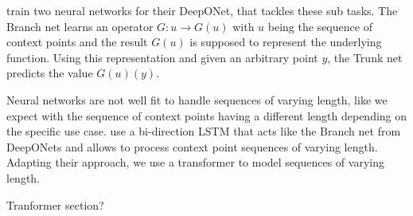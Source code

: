 \citet{Lu_2021} train two neural networks for their DeepONet, that tackles these sub tasks. The Branch net learns an operator $G: u\rightarrow G(u)$ with $u$ being the sequence of context points and the result $G(u)$ is supposed to represent the underlying function. Using this representation and given an arbitrary point $y$, the Trunk net predicts the value $G(u)(y)$. \cite{Lu_2021}

Neural networks are not well fit to handle sequences of varying length, like we expect with the sequence of context points having a different length depending on the specific use case. \citet{seifner2025zeroshotimputationfoundationinference} use a bi-direction LSTM that acts like the Branch net from DeepONets and allows to process context point sequences of varying length. Adapting their approach, we use a transformer to model sequences of varying length.

Tranformer section?